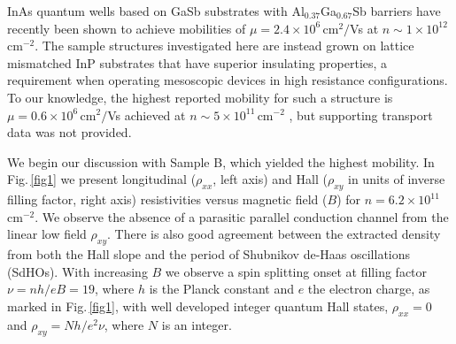 \documentclass[
floatfix,
aps,
prl,
twocolumn,
superscriptaddress,
amssymb,
 groupaddress,
]{revtex4}
\begin{document}
InAs quantum wells based on GaSb substrates with Al$_{0.37}$Ga$_{0.67}$Sb barriers \citep{shojaei:2016} have recently been shown to achieve mobilities of $\mu=2.4 \times 10^{6}\,$cm$^{2}/$Vs  at $n \sim 1 \times 10^{12}\,$cm$^{-2} $\citep{tschirky:2017}.
The sample structures investigated here are instead grown on lattice mismatched InP substrates that have superior insulating properties, a requirement when operating mesoscopic devices in high resistance configurations.
To our knowledge, the highest reported mobility for such a structure is $\mu= 0.6 \times 10^{6}\,$cm$^{2}/$Vs achieved at $n \sim 5 \times 10^{11}\,$cm$^{-2}$ \citep{shabani:2014}, but supporting transport data was not provided.


We begin our discussion with Sample B, which yielded the highest mobility.
In Fig.\,\ref{fig1} we present longitudinal ($\rho_{xx}$, left axis) and Hall ($\rho_{xy}$ in units of inverse filling factor, right axis) resistivities versus magnetic field ($B$) for $n = 6.2 \times 10^{11}\,$cm$^{-2}$.
We observe the absence of a parasitic parallel conduction channel from the linear low field $\rho_{xy}$.
There is also good agreement between the extracted density from both the Hall slope and the period of Shubnikov de-Haas oscillations (SdHOs). 
With increasing $B$ we observe a spin splitting onset at filling factor $\nu=nh/eB=19$, where $h$ is the Planck constant and $e$ the electron charge, as marked in Fig.\,\ref{fig1}, with well developed integer quantum Hall states, $\rho_{xx} = 0$ and $\rho_{xy} =N h/e^{2}\nu$, where $N$ is an integer. 
\end{document}
